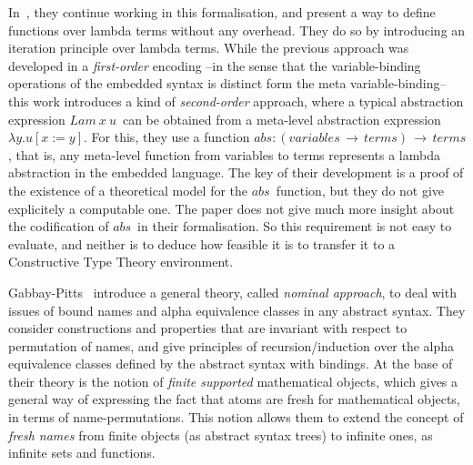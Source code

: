 \documentclass[preprint,10pt]{sigplanconf}
\begin{document}
In~\cite{DBLP:conf/tphol/GordonM96}, they continue working in this formalisation, and present a way to define functions over lambda terms without any overhead. 
They do so by introducing an iteration principle over lambda terms. 
While the previous approach was developed in a \emph{first-order} encoding --in the sense that the variable-binding operations of the embedded syntax is distinct form the meta variable-binding-- this work introduces a kind of \emph{second-order} approach, where a typical abstraction expression $Lam\ x\ u$\ can be obtained from a meta-level abstraction expression $\lambda y . u [x {:=} y]$. For this, they use a function $abs:(variables\,\rightarrow\,terms)\,\rightarrow\,terms$, that is, any meta-level function from variables to terms represents a lambda abstraction in the embedded language. 
The key of their development is a proof of the existence of a theoretical model for the $abs$\ function, but they do not give explicitely a computable one. 
The paper does not give much more insight about the codification of $abs$\ in their formalisation. 
So this requirement is not easy to evaluate, and neither is to deduce how feasible it is to transfer it to a Constructive Type Theory environment. 

Gabbay-Pitts~\cite{GP02:newapproach} introduce a general theory, called \emph{nominal approach}, to deal with issues of bound names and alpha equivalence classes in any abstract syntax. 
They consider constructions and properties that are invariant with respect to permutation of names, and give principles of recursion/induction over the alpha equivalence classes defined by the abstract syntax with bindings. 
At the base of their theory is the notion of \emph{finite supported} mathematical objects, which gives a general way of expressing the fact that atoms are fresh for mathematical objects, in terms of name-permutations. 
This notion allows them to extend the concept of \emph{fresh names} from finite objects (as abstract syntax trees) to infinite ones, as infinite sets and functions.
\end{document}
